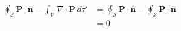 \documentclass{article}
\renewcommand{\vec}[1]{\boldsymbol{\mathbf{#1}}}
\newcommand{\uvec}[1]{\hat{\vec{#1}}}
\begin{document}
\subsection{}

\begin{align*}
  \oint_\mathcal{S} \vec{P} \cdot \uvec{n} - \int_\mathcal{V} \nabla \cdot \vec{P} \,d \tau' & = \oint_\mathcal{S} \vec{P} \cdot \uvec{n} - \oint_\mathcal{S} \vec{P} \cdot \uvec{n} \\
                                                                                             & = 0
\end{align*}

\subsection{}
\end{document}
